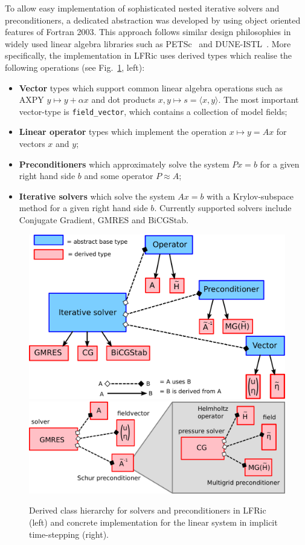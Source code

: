 \documentclass[review,times]{elsarticle}
\begin{document}
To allow easy implementation of sophisticated nested iterative solvers
and preconditioners, a dedicated abstraction was developed by using
object oriented features of Fortran 2003. This approach
follows similar design philosophies in widely used linear algebra
libraries such as PETSc~\cite{Balay1997,Balay2018} and DUNE-ISTL~\cite{Blatt2007}. 
More specifically, the implementation in LFRic uses
derived types which realise the following operations (see
Fig.~\ref{fig:class_hierarchy}, left):
\begin{itemize}
\item \textbf{Vector} types which support common linear algebra
  operations such as AXPY $y\mapsto y+\alpha x$ and dot products
  $x,y\mapsto s = \langle x,y\rangle$. The most important vector-type
  is \texttt{field\_vector}, which contains a collection of model
  fields;
\item \textbf{Linear operator} types which implement the operation $x\mapsto y=Ax$ for vectors $x$ and $y$;
\item \textbf{Preconditioners} which approximately solve the system $Px=b$ for a
  given right hand side $b$ and some operator $P\approx A$;
\item \textbf{Iterative solvers} which solve the system $Ax=b$ with a
  Krylov-subspace method for a given right hand side $b$. Currently
  supported solvers include Conjugate Gradient, GMRES and BiCGStab.
\end{itemize}
\begin{figure}
  \begin{center}
    \includegraphics[width=0.45\linewidth]{class_hierarchy.pdf}
    \hfill
    \includegraphics[width=0.45\linewidth]{class_concrete.pdf}
    \caption{Derived class hierarchy for solvers and preconditioners
      in LFRic (left) and concrete implementation for the linear
      system in implicit time-stepping (right).}
    \label{fig:class_hierarchy}
  \end{center}
\end{figure}
\end{document}
